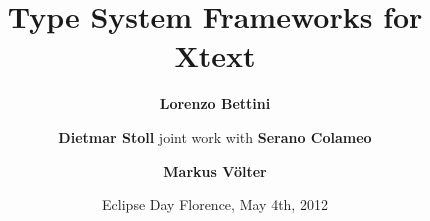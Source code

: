 \title{Type System Frameworks for Xtext}
\author{\textbf{Lorenzo Bettini} \and \textbf{Dietmar Stoll}\br
joint work with\br
\textbf{Serano Colameo} \and \textbf{Markus V\"olter}}
\date{Eclipse Day Florence, May 4th, 2012}


\maketitle 











%




